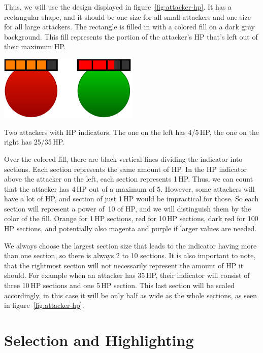 Thus, we will use the design displayed in figure~\ref{fig:attacker-hp}.
It has a rectangular shape, and it should be one size for all small attackers and one size for all large attackers.
The rectangle is filled in with a colored fill on a dark gray background.
This fill represents the portion of the attacker's HP that's left out of their maximum HP.

\begin{center}
    \captionsetup{type=figure}
    \includegraphics[width=0.5\textwidth]{img/Attacker HP.pdf}
    \caption{Two attackers with HP indicators. The one on the left has 4/5\,HP, the one on the right has 25/35\,HP.}
    \label{fig:attacker-hp}
\end{center}

Over the colored fill, there are black vertical lines dividing the indicator into sections.
Each section represents the same amount of HP.
In the HP indicator above the attacker on the left, each section represents 1\,HP.
Thus, we can count that the attacker has 4\,HP out of a maximum of 5.
However, some attackers will have a lot of HP, and section of just 1\,HP would be impractical for those.
So each section will represent a power of~10 of HP, and we will distinguish them by the color of the fill.
Orange for 1\,HP sections, red for 10\,HP sections, dark red for 100\,HP sections, and potentially also magenta and purple if larger values are needed.

We always choose the largest section size that leads to the indicator having more than one section, so there is always 2 to 10 sections.
It is also important to note, that the rightmost section will not necessarily represent the amount of HP it should.
For example when an attacker has 35\,HP, their indicator will consist of three 10\,HP sections and one 5\,HP section.
This last section will be scaled accordingly, in this case it will be only half as wide as the whole sections, as seen in figure~\ref{fig:attacker-hp}.

\section{Selection and Highlighting}

